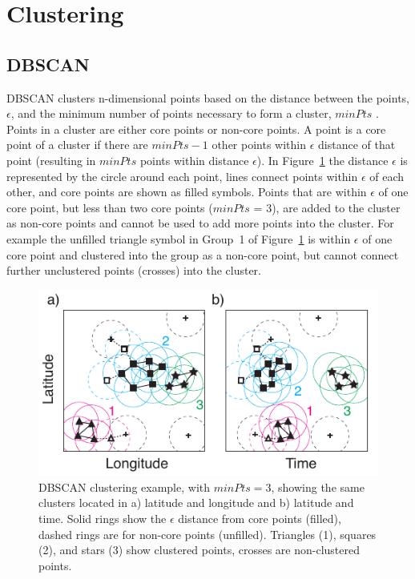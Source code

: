 \section{Clustering}

\subsection{DBSCAN}

DBSCAN clusters n-dimensional points based on the distance between the points, $\epsilon$, and the minimum number of points necessary to form a cluster, $minPts$ \citep{Kriegel2011a}.
Points in a cluster are either core points or non-core points.
A point is a core point of a cluster if there are $minPts - 1$ other points within $\epsilon$ distance of that point (resulting in $minPts$ points within distance $\epsilon$).
In Figure~\ref{gec:fig:dbscan} the distance $\epsilon$ is represented by the circle around each point, lines connect points within $\epsilon$ of each other, and core points are shown as filled symbols.
Points that are within $\epsilon$ of one core point, but less than two core points ($minPts$ = 3), are added to the cluster as non-core points and cannot be used to add more points into the cluster.
For example the unfilled triangle symbol in Group~1 of Figure~\ref{gec:fig:dbscan} is within $\epsilon$ of one core point and clustered into the group as a non-core point, but cannot connect further unclustered points (crosses) into the cluster.

 \begin{figure}[ht!]
    \centering
    \includegraphics[scale=1]{GEC/Figures/dbscan.pdf} 
    \caption{DBSCAN clustering example, with $minPts = 3$, showing the same clusters located in a) latitude and longitude and b) latitude and time.
    		 Solid rings show the $\epsilon$ distance from core points (filled), dashed rings are for non-core points (unfilled).
		 Triangles (1), squares (2), and stars (3) show clustered points, crosses are non-clustered points.}
    \label{gec:fig:dbscan}
 \end{figure}


